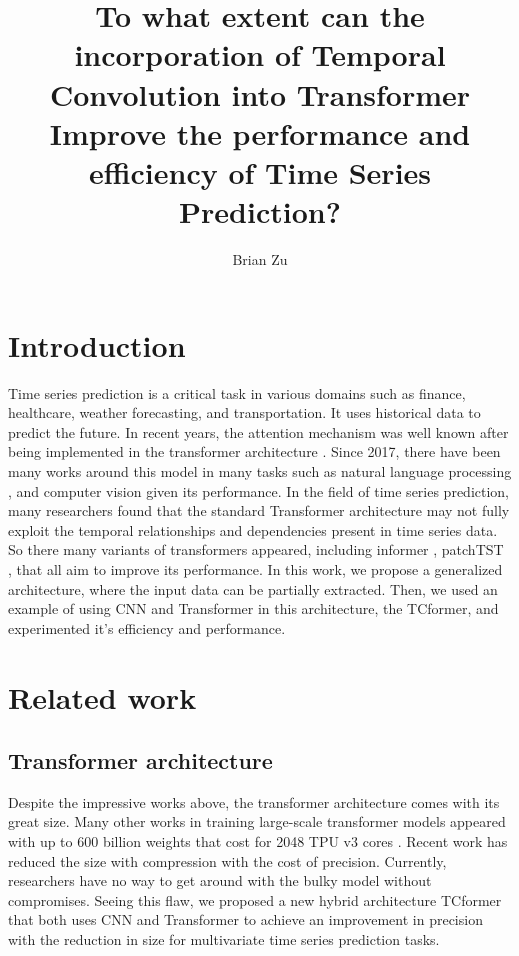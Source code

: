 \documentclass[stu,12pt,floatsintext]{apa7}
\title{To what extent can the incorporation of Temporal Convolution into Transformer Improve the performance and efficiency of Time Series Prediction?}
\author{Brian Zu}
\affiliation{Word Count: 3467}
\begin{document}
\maketitle
\tableofcontents
\newpage

\section{Introduction}
Time series prediction is a critical task in various domains such as finance, healthcare, weather forecasting, and transportation. It uses historical data to predict the future. In recent years, the attention mechanism was well known after being implemented in the transformer architecture \cite{attention-is-all-you-need}. Since 2017, there have been many works around this model in many tasks such as natural language processing \cite{few-shot-learners}, and computer vision \cite{vit} given its performance.  In the field of time series prediction, many researchers found that the standard Transformer architecture may not fully exploit the temporal relationships and dependencies present in time series data. So there many variants of transformers appeared, including informer \cite{informer}, patchTST \cite{patchtst}, that all aim to improve its performance. In this work, we propose a generalized architecture, where the input data can be partially extracted. Then, we used an example of using CNN and Transformer in this architecture, the TCformer, and experimented it's efficiency and performance. 

\section{Related work}

\subsection{Transformer architecture}

Despite the impressive works above, the transformer architecture comes with its great size. Many other works in training large-scale transformer models appeared with up to 600 billion weights that cost for 2048 TPU v3 cores \cite{lepikhin2020gshardscalinggiantmodels}. Recent work \cite{pmlr-v119-li20m} has reduced the size with compression with the cost of precision. Currently, researchers have no way to get around with the bulky model without compromises. Seeing this flaw, we proposed a new hybrid architecture TCformer that both uses CNN and Transformer to achieve an improvement in precision with the reduction in size for multivariate time series prediction tasks. 
\end{document}
